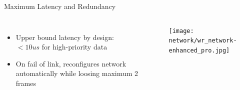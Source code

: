 \documentclass[compress,red]{beamer}
\begin{document}
\begin{frame}{Maximum Latency and Redundancy}

\begin{columns}[c]

      \begin{itemize}
	      \item Upper bound latency by design: \\ $<10us$ for high-priority data
	      \item On fail of link, reconfigures network automatically while loosing maximum 2 frames
      \end{itemize}
% 
    \begin{center}
    \texttt{[image: network/wr\_network-enhanced\_pro.jpg]}
    \end{center}
\end{columns}
\end{frame}

%
%
%
%
\end{document}

